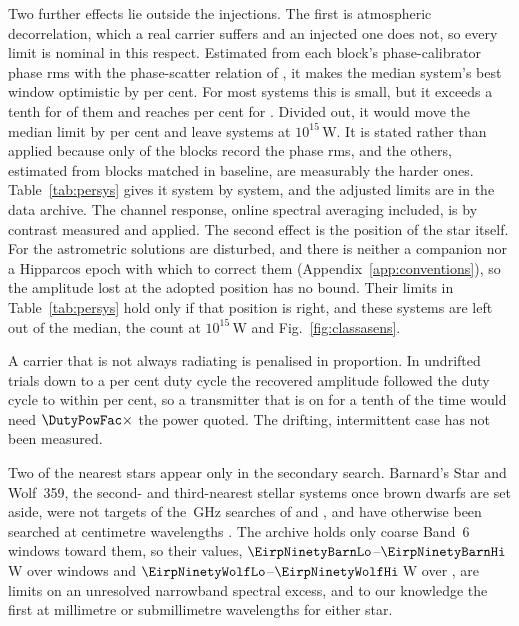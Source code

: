 Two further effects lie outside the injections. The first is atmospheric
decorrelation, which a real carrier suffers and an injected one does not, so
every limit is nominal in this respect. Estimated from each block's
phase-calibrator phase rms \citep[\S\S10.4.11, 11.3.1]{ALMAHandbook} with the
phase-scatter relation of \citet[Eq.~3]{Richards2022}, it makes the median
system's best window optimistic by \NmDecSysMedPct{} per cent. For most
systems this is small, but it exceeds a tenth for \NmDecNBigSys{} of them and
reaches \NmDecSysWorstPct{} per cent for \NmDecSysWorstName. Divided out, it
would move the median limit by \NmDecAdjShiftPct{} per cent and leave
\NmDecAdjNEfifteen{} systems at $10^{15}$\,W. It is stated rather than
applied because only \SensDecorNBlk{} of the \SensDecorNBlkTot{} blocks
record the phase rms, and the others, estimated from blocks matched in
baseline, are measurably the harder ones. Table~\ref{tab:persys} gives it
system by system, and the adjusted limits are in the data archive. The
channel response, online spectral averaging included, is by contrast
measured and applied. The second effect is the position of the star itself.
For \OmFlagStars{} the astrometric solutions are disturbed, and there is
neither a companion nor a Hipparcos epoch with which to correct them
(Appendix~\ref{app:conventions}), so the amplitude lost at the adopted
position has no bound. Their limits in Table~\ref{tab:persys} hold only if
that position is right, and these \OmNFlagWord{} systems are left out of the
median, the count at $10^{15}$\,W and Fig.~\ref{fig:classasens}.

A carrier that is not always radiating is penalised in proportion. In
\DutyNTrial{} undrifted trials down to a \DutyCycleMinPct{} per cent duty
cycle the recovered amplitude followed the duty cycle to within
\DutyAttenDevPct{} per cent, so a transmitter that is on for a tenth of the
time would need $\DutyPowFac\times$ the power quoted. The drifting,
intermittent case has not been measured.

Two of the nearest stars appear only in the secondary search. Barnard's Star and Wolf~359, the second-
and third-nearest stellar systems once brown dwarfs are set aside, were not
targets of the \SbPriorFreqGHz\,GHz searches of \citet{Steffes1994} and
\citet{Mauersberger1996}, and have otherwise been searched at centimetre
wavelengths \citep{Enriquez2017,Price2020,Margot2023}. The archive holds only
coarse Band~6 windows toward them, so their values,
$\EirpNinetyBarnLo$--$\EirpNinetyBarnHi$\,W over \NWinBarn{} windows and
$\EirpNinetyWolfLo$--$\EirpNinetyWolfHi$\,W over \NWinWolf, are limits on an
unresolved narrowband spectral excess, and to our knowledge the first at
millimetre or submillimetre wavelengths for either star.

